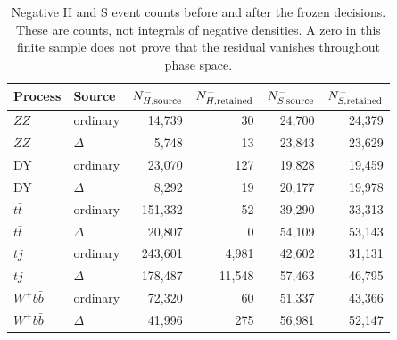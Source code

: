 \begin{table}[tbp]
\centering\small
\begin{tabular}{llrrrr}
\toprule
Process & Source & $N^-_{H,\rm source}$ & $N^-_{H,\rm retained}$ & $N^-_{S,\rm source}$ & $N^-_{S,\rm retained}$\\
\midrule
$ZZ$ & ordinary & 14,739 & 30 & 24,700 & 24,379\\
$ZZ$ & $\Delta$ & 5,748 & 13 & 23,843 & 23,629\\
DY & ordinary & 23,070 & 127 & 19,828 & 19,459\\
DY & $\Delta$ & 8,292 & 19 & 20,177 & 19,978\\
$t\bar t$ & ordinary & 151,332 & 52 & 39,290 & 33,313\\
$t\bar t$ & $\Delta$ & 20,807 & 0 & 54,109 & 53,143\\
$tj$ & ordinary & 243,601 & 4,981 & 42,602 & 31,131\\
$tj$ & $\Delta$ & 178,487 & 11,548 & 57,463 & 46,795\\
$W^+b\bar b$ & ordinary & 72,320 & 60 & 51,337 & 43,366\\
$W^+b\bar b$ & $\Delta$ & 41,996 & 275 & 56,981 & 52,147\\
\bottomrule
\end{tabular}
\caption{Negative H and S event counts before and after the frozen decisions. These are counts, not integrals of negative densities. A zero in this finite sample does not prove that the residual vanishes throughout phase space.}
\label{tab:negatives}
\end{table}
